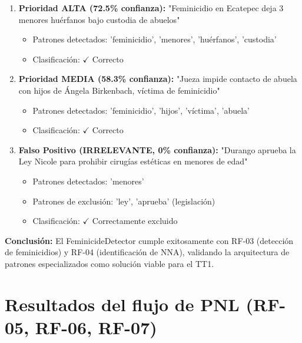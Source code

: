 \begin{enumerate}
    \item \textbf{Prioridad ALTA (72.5\% confianza):} "Feminicidio en Ecatepec deja 3 menores huérfanos bajo custodia de abuelos"
    \begin{itemize}
        \item Patrones detectados: 'feminicidio', 'menores', 'huérfanos', 'custodia'
        \item Clasificación: $\checkmark$ Correcto
    \end{itemize}
    
    \item \textbf{Prioridad MEDIA (58.3\% confianza):} "Jueza impide contacto de abuela con hijos de Ángela Birkenbach, víctima de feminicidio"
    \begin{itemize}
        \item Patrones detectados: 'feminicidio', 'hijos', 'víctima', 'abuela'
        \item Clasificación: $\checkmark$ Correcto
    \end{itemize}
    
    \item \textbf{Falso Positivo (IRRELEVANTE, 0\% confianza):} "Durango aprueba la Ley Nicole para prohibir cirugías estéticas en menores de edad"
    \begin{itemize}
        \item Patrones detectados: 'menores'
        \item Patrones de exclusión: 'ley', 'aprueba' (legislación)
        \item Clasificación: $\checkmark$ Correctamente excluido
    \end{itemize}
\end{enumerate}

\textbf{Conclusión:} El FeminicideDetector cumple exitosamente con RF-03 (detección de feminicidios) y RF-04 (identificación de NNA), validando la arquitectura de patrones especializados como solución viable para el TT1.

\section{Resultados del flujo de PNL (RF-05, RF-06, RF-07)}
\label{sec:resultados_pnl}


